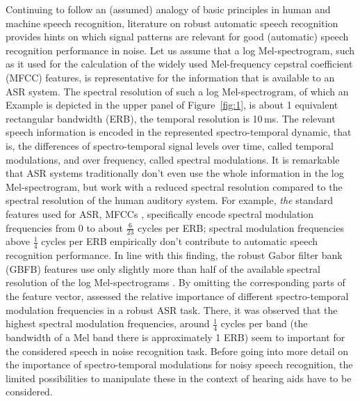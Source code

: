 \documentclass[10pt,a4paper,twocolumn]{article}
\begin{document}
Continuing to follow an (assumed) analogy of basic principles in human and machine speech recognition, literature on robust automatic speech recognition provides hints on which signal patterns are relevant for good (automatic) speech recognition performance in noise.
%
Let us assume that a log Mel-spectrogram, such as it used for the calculation of the widely used Mel-frequency cepstral coefficient (MFCC) features, is representative for the information that is available to an ASR system.
%
The spectral resolution of such a log Mel-spectrogram, of which an Example is depicted in the upper panel of Figure~\ref{fig:1}, is about 1 equivalent rectangular bandwidth (ERB), the temporal resolution is 10\,ms.
%
The relevant speech information is encoded in the represented spectro-temporal dynamic, that is, the differences of spectro-temporal signal levels over time, called temporal modulations, and over frequency, called spectral modulations.
%
It is remarkable that ASR systems traditionally don't even use the whole information in the log Mel-spectrogram, but work with a reduced spectral resolution compared to the spectral resolution of the human auditory system.
%
For example, \emph{the} standard features used for ASR, MFCCs \citep{etsi2007}, specifically encode spectral modulation frequencies from $0$ to about $\frac{6}{23}$ cycles per ERB; spectral modulation frequencies above $\frac{1}{4}$ cycles per ERB empirically don't contribute to automatic speech recognition performance.
%
In line with this finding, the robust Gabor filter bank (GBFB) features use only slightly more than half of the available spectral resolution of the log Mel-spectrograms \cite[c.f.][]{schaedler2012}.
%
By omitting the corresponding parts of the feature vector, \cite{schaedler2012} assessed the relative importance of different spectro-temporal modulation frequencies in a robust ASR task.
%
There, it was observed that the highest spectral modulation frequencies, around $\frac{1}{4}$ cycles per band (the bandwidth of a Mel band there is approximately 1 ERB) seem to important for the considered speech in noise recognition task.
%
Before going into more detail on the importance of spectro-temporal modulations for noisy speech recognition,
the limited possibilities to manipulate these in the context of hearing aids have to be considered.
\end{document}

